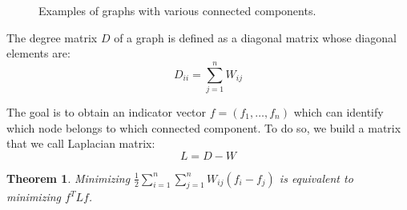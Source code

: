 \documentclass{article}
\newtheorem{theorem}{Theorem}
\begin{document}
\begin{figure}[hb]
    \hfill
    \hfill
    \hfill
    \caption{Examples of graphs with various connected components.}%
    \label{figure:plotga}%
\end{figure}

The degree matrix $D$ of a graph is defined as a diagonal matrix whose diagonal elements are:
\begin{equation*}
    D_{ii} = \sum_{j=1}^n W_{ij}
\end{equation*}

The goal is to obtain an indicator vector $f = (f_1, \dots, f_n)$ which can identify which
node belongs to which connected component.
To do so, we build a matrix that we call Laplacian matrix:
\begin{equation*}
    L = D - W
\end{equation*}

\begin{theorem}
    Minimizing $\frac{1}{2} \sum_{i=1}^n \sum_{j=1}^n W_{ij} (f_i - f_j)$
    is equivalent to minimizing $f^T L f$.
\end{theorem}
\end{document}
